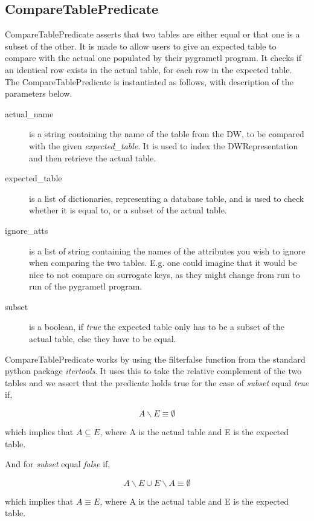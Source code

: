 \subsection{CompareTablePredicate}
CompareTablePredicate asserts that two tables are either equal or that one is a subset of the other. It is made to allow users to give an expected table to compare with the actual one populated by their pygrametl program. It checks if an identical row exists in the actual table, for each row in the expected table. The CompareTablePredicate is instantiated as follows, with description of the parameters below.


\begin{description}
\item [actual\_name] is a string containing the name of the table from the DW, to be compared with the given \textit{expected\_table}. It is used to index the DWRepresentation and then retrieve the actual table.
\item [expected\_table] is a list of dictionaries, representing a database table, and is used to check whether it is equal to, or a subset of the actual table.
\item [ignore\_atts] is a list of string containing the names of the attributes you wish to ignore when comparing the two tables. E.g. one could imagine that it would be nice to not compare on surrogate keys, as they might change from run to run of the pygrametl program.
  \item [subset] is a boolean, if \textit{true} the expected table only has to be a subset of the actual table, else they have to be equal.
\end{description}

CompareTablePredicate works by using the filterfalse function from the standard python package \textit{itertools}. It uses this to take the relative complement of the two tables and we assert that the predicate holds true for the case of \textit{subset} equal \textit{true} if,

\[ A \backslash E \equiv \emptyset \]

\noindent which implies that $A \subseteq E$, where A is the actual table and E is the expected table.

And for \textit{subset} equal \textit{false} if,

\[ A \backslash E \cup E \backslash A \equiv \emptyset \]

\noindent which implies that $A \equiv E$, where A is the actual table and E is the expected table.
